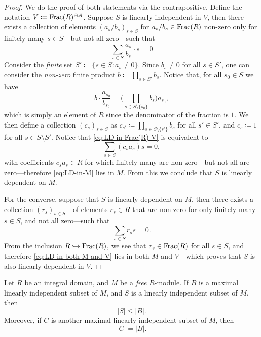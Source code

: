\begin{proof}
    We do the proof of both statements via the contrapositive. Define the notation
    \(V \coloneq \operatorname{Frac}(R)^{\oplus A}\). Suppose \(S\) is linearly independent in
    \(V\), then there exists a collection of elements \((a_s/b_s)_{s \in S}\) for
    \(a_s/b_s \in \operatorname{Frac}(R)\) non-zero only for finitely many \(s \in S\)---but not
    all zero---such that
    \begin{equation}\label{eq:LD-in-Frac(R)-V}
        \sum_{s \in S} \frac{a_s}{b_s} \cdot s = 0
    \end{equation}
    Consider the \emph{finite} set \(S' \coloneq \{s \in S \colon a_s \neq
    0\}\). Since \(b_s \neq 0\) for all \(s \in S'\), one can consider the
    \emph{non-zero} finite product \(b \coloneq \prod_{s \in S'} b_s\). Notice that,
    for all \(s_0 \in S\) we have
    \[
        b \cdot \frac{a_{s_0}}{b_{s_0}}
        = \bigg(\prod_{s \in S \setminus \{s_0\}} b_s \bigg) a_{s_0},
    \]
    which is simply an element of \(R\) since the denominator of the fraction is
    \(1\). We then define a collection \((c_s)_{s \in S}\) as
    \(c_{s'} \coloneq \prod_{s \in S \setminus \{s'\}} b_s\) for all \(s' \in S'\),
    and \(c_s \coloneq 1\) for all \(s \in S \setminus S'\). Notice that
    \cref{eq:LD-in-Frac(R)-V} is equivalent to
    \begin{equation}\label{eq:LD-in-M}
        \sum_{s \in S} (c_s a_s) s = 0,
    \end{equation}
    with coefficients \(c_s a_s \in R\) for which finitely many are non-zero---but
    not all are zero---therefore \cref{eq:LD-in-M} lies in \(M\). From this we
    conclude that \(S\) is linearly dependent on \(M\).

    For the converse, suppose that \(S\) is linearly dependent on \(M\), then there
    exists a collection \((r_s)_{s \in S}\)---of elements \(r_s \in R\) that are
    non-zero for only finitely many \(s \in S\), and not all zero---such that
    \begin{equation}\label{eq:LD-in-both-M-and-V}
        \sum_{s \in S} r_s s = 0.
    \end{equation}
    From the inclusion \(R \hookrightarrow \operatorname{Frac}(R)\), we see that \(r_s \in \operatorname{Frac}(R)\) for all
    \(s \in S\), and therefore \cref{eq:LD-in-both-M-and-V} lies in both \(M\) and
    \(V\)---which proves that \(S\) is also linearly dependent in \(V\).
\end{proof}

\begin{proposition}
    \label{prop:LI-leq-maximal-LI}
    Let \(R\) be an integral domain, and \(M\) be a \emph{free} \(R\)-module. If
    \(B\) is a maximal linearly independent subset of \(M\), and \(S\) is a linearly
    independent subset of \(M\), then
    \[
        |S| \leq |B|.
    \]
    Moreover, if \(C\) is another maximal linearly independent subset of \(M\),
    then
    \[
        |C| = |B|.
    \]
\end{proposition}

